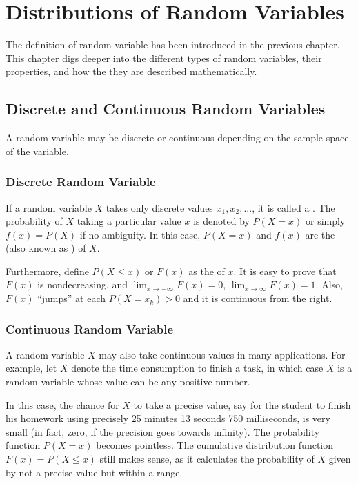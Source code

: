 \chapter{Distributions of Random Variables} \label{ch:rv}

The definition of random variable has been introduced in the previous chapter. This chapter digs deeper into the different types of random variables, their properties, and how the they are described mathematically.

\section{Discrete and Continuous Random Variables}

A random variable may be discrete or continuous depending on the sample space of the variable.

\subsection{Discrete Random Variable}

If a random variable $X$ takes only discrete values $x_1, x_2, ...$, it is called a .
The probability of $X$ taking a particular value $x$ is denoted by $P(X=x)$ or simply $f(x)=P(X)$ if no ambiguity. In this case, $P(X=x)$ and $f(x)$ are the  (also known as ) of $X$.

Furthermore, define $P(X\leq x)$ or $F(x)$ as the  of $x$. It is easy to prove that $F(x)$ is nondecreasing, and $\lim_{x\rightarrow -\infty}F(x)=0$, $\lim_{x\rightarrow \infty}F(x)=1$. Also, $F(x)$ ``jumps'' at each $P(X=x_k)>0$ and it is continuous from the right.

\subsection{Continuous Random Variable}

A random variable $X$ may also take continuous values in many applications. For example, let $X$ denote the time consumption to finish a task, in which case $X$ is a random variable whose value can be any positive number.

In this case, the chance for $X$ to take a precise value, say for the student to finish his homework using precisely 25 minutes 13 seconds 750 milliseconds, is very small (in fact, zero, if the precision goes towards infinity). The probability function $P(X=x)$ becomes pointless. The cumulative distribution function $F(x) = P(X\leq x)$ still makes sense, as it calculates the probability of $X$ given by not a precise value but within a range.

